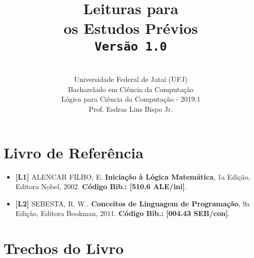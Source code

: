 \documentclass[12pt,a4paper,oneside]{article}
\author{\\Universidade Federal de Jataí (UFJ)\\Bacharelado em Ciência da Computação \\Lógica para Ciência da Computação - 2019.1 \\Prof. Esdras Lins Bispo Jr.}
\date{}
\title{
	\sc \huge Leituras para \\os Estudos Prévios
	\\{\tt Versão 1.0}
}
\begin{document}
\maketitle

\section{Livro de Referência}
	\begin{itemize}
		\item[] {\bf \color{blue} [L1]} ALENCAR FILHO, E. {\bf Iniciação à Lógica Matemática}, 1a Edição, Editora Nobel, 2002. {\color{blue} \bf Código Bib.: [510.6 ALE/ini]}.
		\item[] {\bf \color{purple} [L2]} SEBESTA, R. W.. {\bf Conceitos de Linguagem de Programação}, 9a Edição, Editora Bookman, 2011. { \color{purple} \bf Código Bib.: [004.43 SEB/con]}.
	\end{itemize}
	
\section{Trechos do Livro}
\end{document}

